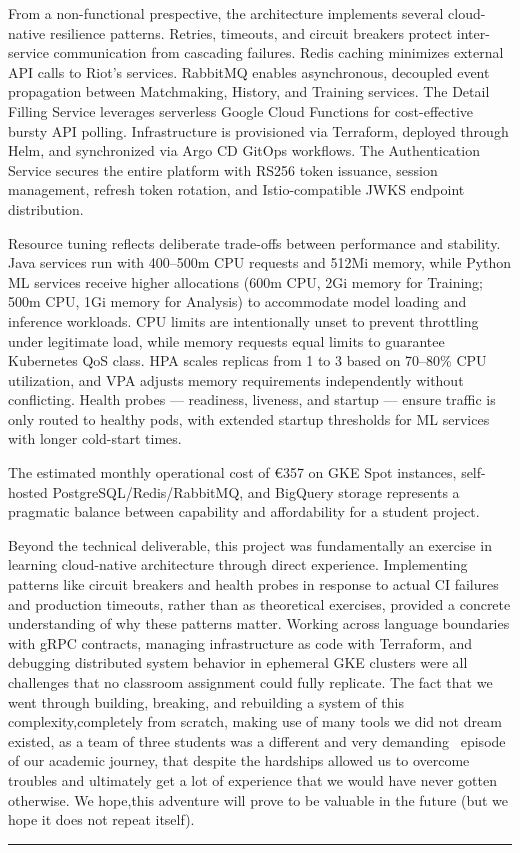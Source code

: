 \documentclass[11pt,a4paper]{article}
\begin{document}
 From a non-functional prespective, the architecture implements several cloud-native resilience patterns. Retries, timeouts, and circuit breakers protect inter-service communication from cascading failures. Redis caching minimizes external API calls to Riot's services. RabbitMQ enables asynchronous, decoupled event propagation between Matchmaking, History, and Training services. The Detail Filling Service leverages serverless Google Cloud Functions for cost-effective bursty API polling. Infrastructure is provisioned via Terraform, deployed through Helm, and synchronized via Argo CD GitOps workflows. The Authentication Service secures the entire platform with RS256 token issuance, session management, refresh token rotation, and Istio-compatible JWKS endpoint distribution.

 Resource tuning reflects deliberate trade-offs between performance and stability. Java services run with 400--500m CPU requests and 512Mi memory, while Python ML services receive higher allocations (600m CPU, 2Gi memory for Training; 500m CPU, 1Gi memory for Analysis) to accommodate model loading and inference workloads. CPU limits are intentionally unset to prevent throttling under legitimate load, while memory requests equal limits to guarantee Kubernetes QoS class. HPA scales replicas from 1 to 3 based on 70--80\% CPU utilization, and VPA adjusts memory requirements independently without conflicting. Health probes --- readiness, liveness, and startup --- ensure traffic is only routed to healthy pods, with extended startup thresholds for ML services with longer cold-start times.

 The estimated monthly operational cost of \euro357 on GKE Spot instances, self-hosted PostgreSQL/Redis/RabbitMQ, and BigQuery storage represents a pragmatic balance between capability and affordability for a student project.

 Beyond the technical deliverable, this project was fundamentally an exercise in learning cloud-native architecture through direct experience. Implementing patterns like circuit breakers and health probes in response to actual CI failures and production timeouts, rather than as theoretical exercises, provided a concrete understanding of why these patterns matter. Working across language boundaries with gRPC contracts, managing infrastructure as code with Terraform, and debugging distributed system behavior in ephemeral GKE clusters were all challenges that no classroom assignment could fully replicate. The fact that we went through building, breaking, and rebuilding a system of this complexity,completely from scratch, making use of many tools we did not dream existed, as a team of three students was a different and very demanding  episode of our academic journey, that despite the hardships allowed us to overcome troubles and ultimately get a lot of experience that we would have never gotten otherwise. We hope,this adventure will prove to be valuable in the future (but we hope it does not repeat itself). 

 \vspace{1cm}
 \hrule
 \vspace{1cm}
\end{document}
